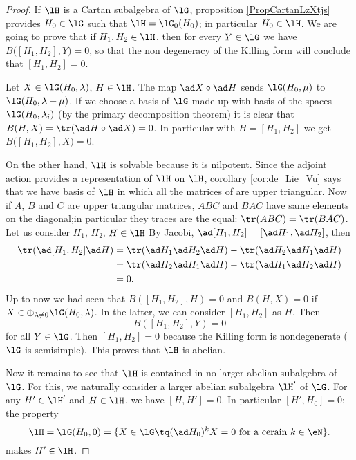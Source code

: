 \begin{proof}
    If \( \lH\) is a Cartan subalgebra of \( \lG\), proposition \ref{PropCartanLzXtjs} provides \( H_0\in\lG\) such that \( \lH=\lG_0(H_0)\); in particular \( H_0\in\lH\). We are going to prove that if \( H_1,H_2\in\lH\), then for every \( Y\in\lG\) we have \( B\big( [H_1,H_2],Y \big)=0\), so that the non degeneracy of the Killing form will conclude that \( [H_1,H_2]=0\).

    
    Let $X\in\lG(H_0,\lambda)$, $H\in\lH$. The map $\ad X\circ\ad H$ sends $\lG(H_0,\mu)$ to $\lG(H_0,\lambda+\mu)$. If we choose a basis of $\lG$ made up with basis of the spaces $\lG(H_0,\lambda_i)$ (by the primary decomposition theorem) it is clear that $B(H,X)=\tr(\ad H\circ\ad X)=0$. In particular with \( H=[H_1,H_2]\) we get \( B\big( [H_1,H_2],X \big)=0\).

    On the other hand, $\lH$ is solvable because it is nilpotent. Since the adjoint action provides a representation of \( \lH\) on \( \lH\), corollary \ref{cor:de_Lie_Vu} says that we have  basis of $\lH$ in which all the matrices of are upper triangular. Now if $A$, $B$ and $C$ are upper triangular matrices, $ABC$ and $BAC$ have same elements on the diagonal;in particular they traces are the equal: $\tr(ABC)=\tr(BAC)$. Let us consider $H_1$, $H_2$, $H\in\lH$ By Jacobi, $\ad[H_1,H_2]=[\ad H_1,\ad H_2]$, then
    \begin{equation}
    \begin{split}
    \tr(\ad[H_1,H_2]\ad H)&=\tr(\ad H_1\ad H_2\ad H)-\tr(\ad H_2\ad H_1\ad H)\\
    &=\tr(\ad H_2\ad H_1\ad H)-\tr(\ad H_1\ad H_2\ad H)\\
    &=0.
    \end{split}
    \end{equation}
    Up to now we had seen that $B([H_1,H_2],H)=0$ and $B(H,X)=0$ if $X\in\oplus_{\lambda\neq 0}\lG(H_0,\lambda)$. In the latter, we can consider $[H_1,H_2]$ as $H$. Then 
    \[
    B([H_1,H_2],Y)=0
    \]
    for all $Y\in\lG$. Then $[H_1,H_2]=0$ because the Killing form is nondegenerate ($\lG$ is semisimple). This proves that $\lH$ is abelian.

    Now it remains to see that $\lH$ is contained in no larger abelian subalgebra of $\lG$. For this, we naturally consider a larger abelian subalgebra $\lH'$ of $\lG$. For any $H'\in\lH'$ and $H\in\lH$, we have $[H,H']=0$. In particular $[H',H_0]=0$; the property 
    \[
    \lH=\lG(H_0,0)=\{X\in\lG\tq (\ad H_0)^kX=0\text{ for a cerain }k\in\eN\}.
    \]
    makes $H'\in\lH$.
\end{proof}


